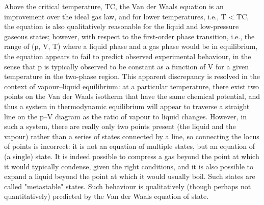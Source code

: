 \documentclass[a4paper, 11pt]{article}
\begin{document}
Above the critical temperature, TC, the Van der Waals equation is an improvement over the ideal gas law, and for lower temperatures, i.e., T < TC, the equation is also qualitatively reasonable for the liquid and low-pressure gaseous states; however, with respect to the first-order phase transition, i.e., the range of (p, V, T) where a liquid phase and a gas phase would be in equilibrium, the equation appears to fail to predict observed experimental behaviour, in the sense that p is typically observed to be constant as a function of V for a given temperature in the two-phase region. This apparent discrepancy is resolved in the context of vapour–liquid equilibrium: at a particular temperature, there exist two points on the Van der Waals isotherm that have the same chemical potential, and thus a system in thermodynamic equilibrium will appear to traverse a straight line on the p–V diagram as the ratio of vapour to liquid changes. However, in such a system, there are really only two points present (the liquid and the vapour) rather than a series of states connected by a line, so connecting the locus of points is incorrect: it is not an equation of multiple states, but an equation of (a single) state. It is indeed possible to compress a gas beyond the point at which it would typically condense, given the right conditions, and it is also possible to expand a liquid beyond the point at which it would usually boil. Such states are called "metastable" states. Such behaviour is qualitatively (though perhaps not quantitatively) predicted by the Van der Waals equation of state.
\cite{website}





\end{document}

